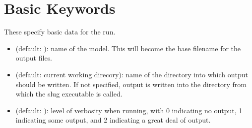 \documentclass[letterpaper,10pt,english]{sphinxmanual}
\begin{document}
\section{Basic Keywords}
\label{\detokenize{parameters:basic-keywords}}\label{\detokenize{parameters:ssec-basic-keywords}}
These specify basic data for the run.
\begin{itemize}
\item {} 
 (default: ): name of the model. This will become the base filename for the output files.

\item {} 
 (default: current working direcory): name of the directory into which output should be written. If not specified, output is written into the directory from which the slug executable is called.

\item {} 
 (default: ): level of verbosity when running, with 0 indicating no output, 1 indicating some output, and 2 indicating a great deal of output.

\end{itemize}
\end{document}
